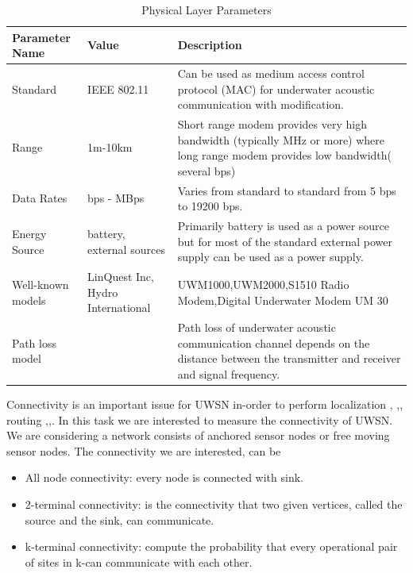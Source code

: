 \documentclass[11pt]{article}
\begin{document}
\begin{table}[ht]
\caption{Physical Layer Parameters}
\begin{tabular}{|p{2 cm}|p{3cm}|p{10.2cm}|}
\hline
Parameter Name & Value & Description \\\hline 
Standard & IEEE 802.11 & Can be used as medium access control protocol (MAC) for underwater acoustic communication with modification\cite{Farrell201262}.\\ \hline
Range & 1m-10km \cite{heidemann2012underwater} & Short range modem provides very high bandwidth (typically MHz or more) where long range modem provides low bandwidth( several bps) \\ \hline
Data Rates & bps - MBps & Varies from standard to standard from 5 bps to 19200 bps.
\\\hline
Energy Source & battery, external sources& Primarily battery is used as a power source but for most of the standard external power supply can be used as a power supply.
\\\hline
Well-known models & LinQuest Inc, Hydro International &UWM1000,UWM2000,S1510 Radio Modem,Digital Underwater Modem UM 30 
 
\\\hline
Path loss model & & Path loss of underwater acoustic communication channel depends on the distance between the transmitter and receiver and signal frequency\cite{stship}. \\\hline
\end{tabular}
\end{table}
Connectivity is an important issue for UWSN in-order to perform localization \cite{zhou2010efficient}, \cite{zhou2011scalable},\cite{erol2011performance}, routing \cite{noh2013vapr},\cite{ying2011combining},\cite{lee2010pressure}. In this task we are interested to measure the connectivity of UWSN. We are considering a network consists of anchored sensor nodes or free moving sensor nodes. The connectivity we are interested, can be 
\begin{itemize}[noitemsep,nolistsep]
\item All node connectivity: every node is connected with sink.
\item 2-terminal connectivity: is the connectivity that two given vertices, called the source and the
sink, can communicate.
\item k-terminal connectivity: compute the probability that every operational pair of sites in k-can communicate
with each other.
\end{itemize}
 
\end{document}
